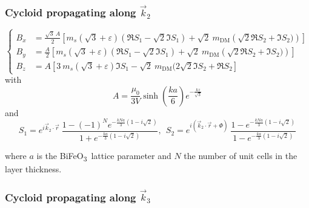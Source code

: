 \documentclass[a4paper,12pt]{article}
\newcommand{\BFO}{BiFeO\textsubscript{3}\ }
\begin{document}
\subsubsection{Cycloid propagating along $\vec{k}_2$}
\begin{equation*}
  \left \lbrace
    \begin{aligned}
      B_x & = \frac{\sqrt{3} \ A}{2}  \left[ m_s  (\sqrt{3} + \varepsilon)\left( \Re{S_1} - \sqrt{2} \Im{S_1} \right) + \sqrt{2} \ m_\text{DM} \left( \sqrt{2} \Re{S_2} +  \Im{S_2)}  \right) \right]\\
      B_y &= \frac{A}{2}   \left[ m_s  (\sqrt{3} + \varepsilon)\left( \Re{S_1} - \sqrt{2} \Im{S_1} \right) + \sqrt{2} \ m_\text{DM} \left(  \sqrt{2} \Re{S_2} + \Im{S_2)}  \right) \right]\\
      B_z & = A  \left[ 3 \ m_s (\sqrt{3}+\varepsilon) \Im{S_1} - \sqrt{2} \ m_\text{DM}(2\sqrt{2} \Im{S_2} + \Re{S_2}  \right]
    \end{aligned}
  \right. 
\end{equation*}
with
\begin{equation*}
  A = \frac{\mu_0}{3V} \sinh\left( \frac{ka}{6}\right) e^{-\frac{kz}{\sqrt{3}}}
\end{equation*}
and
\begin{equation*}
 S_1  = e^{i\vec{k}_2 \cdot \vec{r}} \ \frac{1-(-1)^Ne^{-\frac{kNa}{3}(1-i\sqrt{2})}}{1 + e^{-\frac{ka}{3}(1-i\sqrt{2})}}, \ \
 S_2  = e^{i(\vec{k}_2 \cdot \vec{r} + \Phi)} \ \frac{1-e^{-\frac{kNa}{3}(1-i\sqrt{2})}}{1 - e^{-\frac{ka}{3}(1-i\sqrt{2})}} 
\end{equation*}

where $a$ is the \BFO lattice parameter and $N$ the number of unit cells in the layer thickness.

\subsubsection{Cycloid propagating along $\vec{k}_3$}
\end{document}
